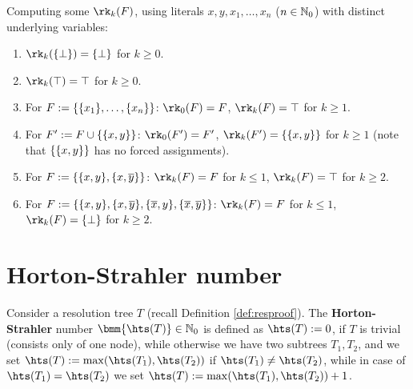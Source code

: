 \documentclass[12pt]{book}
\begin{document}
\begin{examp}\label{exp:rk}
  Computing some $\rk_k(F)$, using literals $x,y,x_1,\dots,x_n$ ($n \in \mathbb{N}_0$) with distinct underlying variables:
  \begin{enumerate}
  \item $\rk_k(\set{\bot}) = \set{\bot}$ for $k \ge 0$.
  \item $\rk_k(\top) = \top$ for $k \ge 0$.
  \item For $F := \{ \{ x_1 \},\dots,\{ x_n \} \}$: $\rk_0(F) = F$, $\rk_k(F) = \top$ for $k \ge 1$.
  \item For $F' := F \cup \{ \{ x,y \} \}$: $\rk_0(F') = F'$, $\rk_k(F') = \set{\set{x,y}}$ for $k \ge 1$ (note that $\{ \{ x,y \} \}$ has no forced assignments).
  \item For $F := \{ \{ x,y \},\{ x,\overline{y} \} \}$: $\rk_k(F) = F$ for $k \le 1$, $\rk_k(F) = \top$ for $k \ge 2$.
  \item For $F := \{ \{ x,y \},\{ x,\overline{y} \}, \{ \overline{x},y \},\{ \overline{x},\overline{y} \} \}$: $\rk_k(F) = F$ for $k \le 1$, $\rk_k(F) = \set{\bot}$ for $k \ge 2$.
  \end{enumerate}
\end{examp}

\section{Horton-Strahler number}
\label{sec:hs}
\begin{defi}\label{def:hdtree}
  Consider a resolution tree $T$ (recall Definition \ref{def:resproof}). The \textbf{Horton-Strahler} number $\bmm{\hts(T)} \in \NNZ$ 
  is defined as $\hts(T) := 0$, if $T$ is trivial (consists only of one node), while otherwise we have two subtrees $T_1, T_2$, and 
  we set $\hts(T) := \max(\hts(T_1),\hts(T_2))$ if $\hts(T_1) \not= \hts(T_2)$, while in case of $\hts(T_1) = \hts(T_2)$ we set $\hts(T) := \max(\hts(T_1),\hts(T_2)) + 1$.
\end{defi}
\end{document}
